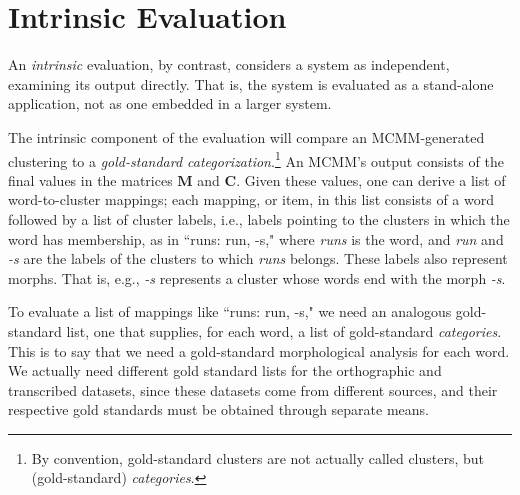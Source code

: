 \section{Intrinsic Evaluation}
An \emph{intrinsic} evaluation, by contrast, considers a system as independent, examining its output directly. That is, the system is evaluated as a stand-alone application, not as one embedded in a larger system.

The intrinsic component of the evaluation will compare an MCMM-generated clustering to a 
\emph{gold-standard categorization}.\footnote{By convention, 
gold-standard clusters are not actually called clusters, 
but (gold-standard) \emph{categories}.} 
An MCMM's output consists of 
the final values in the matrices $\mathbf{M}$ and $\mathbf{C}$.
Given these values, one can derive a list of word-to-cluster mappings; each mapping, or item, 
in this list
consists of a word followed by a list of cluster labels, i.e., labels pointing to
the clusters in which the word has membership, 
as in ``runs: run, -s,"  where \textit{runs} is the word, and \textit{run} and \textit{-s} 
are the labels of the clusters to which \textit{runs} belongs. These labels also represent morphs. That is, e.g., \emph{-s} represents a cluster whose words end with the morph \emph{-s}.

To evaluate a list of mappings like ``runs: run, -s," we need an analogous gold-standard list, 
one that supplies, for each word, a list of
gold-standard \emph{categories}.
This is to say that we need a gold-standard morphological analysis for each word. 
We actually need different gold standard lists for the orthographic and transcribed datasets, 
since these datasets come from different sources, and their respective gold standards must 
be obtained through separate means.

 
